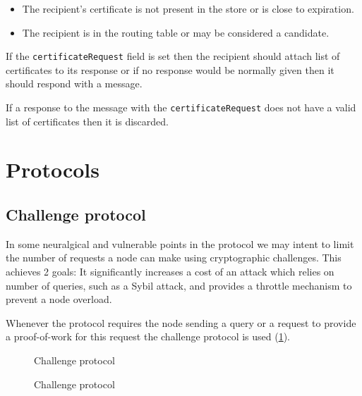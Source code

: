 \begin{itemize}
  \item The recipient's certificate is not present in the store or is close to
    expiration.
  \item The recipient is in the routing table or may be considered a candidate.
\end{itemize}

If the \texttt{certificateRequest} field is set then the recipient should attach
list of certificates to its response or if no response would be normally given
then it should respond with a  message.

If a response to the message with the \texttt{certificateRequest} does not have
a valid list of certificates then it is discarded.

\section{Protocols}
\label{sec:ghoul_protocols}
\subsection{Challenge protocol}
In some neuralgical and vulnerable points in the protocol we may intent to limit
the number of requests a node can make using cryptographic challenges. This
achieves 2 goals: It significantly increases a cost of an attack which relies on
number of queries, such as a Sybil attack, and provides a throttle mechanism to
prevent a node overload.

Whenever the protocol requires the node sending a query or a request to provide
a proof-of-work for this request the challenge protocol is used
(\ref{fig:chal_prot}).

\begin{figure}
\begin{msc}{Challenge protocol}
\setlength{\instdist}{9cm}
\setlength{\envinstdist}{3cm}
\nextlevel
{}
\nextlevel[11]
\nextlevel[1]
\nextlevel[4]
\nextlevel
{}
\nextlevel[4]
\end{msc}
  \caption{Challenge protocol}
  \label{fig:chal_prot}
\end{figure}

